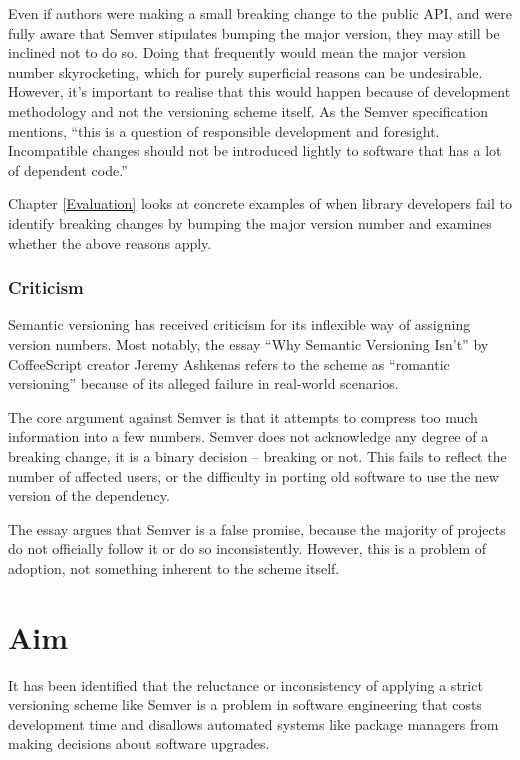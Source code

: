 \documentclass{l4proj}
\begin{document}
Even if authors were making a small breaking change to the public API,
and were fully aware that Semver stipulates bumping the major version,
they may still be inclined not to do so. Doing that frequently would
mean the major version number skyrocketing, which for purely
superficial reasons can be undesirable. However, it's important to
realise that this would happen because of development methodology and
not the versioning scheme itself. As the Semver specification
mentions, ``this is a question of responsible development and
foresight. Incompatible changes should not be introduced lightly to
software that has a lot of dependent code.''

Chapter \ref{Evaluation} looks at concrete examples of when
library developers fail to identify breaking changes by bumping the
major version number and examines whether the above reasons apply.

\subsubsection{Criticism}

Semantic versioning has received criticism for its inflexible way of
assigning version numbers. Most notably, the essay ``Why Semantic
Versioning Isn't'' \cite{WhySemanticVersioningIsnt} by CoffeeScript
creator Jeremy Ashkenas refers to the scheme as ``romantic
versioning'' because of its alleged failure in real-world scenarios.

The core argument against Semver is that it attempts to compress too
much information into a few numbers. Semver does not acknowledge any
degree of a breaking change, it is a binary decision -- breaking or not.
This fails to reflect the number of affected users, or the difficulty
in porting old software to use the new version of the dependency.

The essay argues that Semver is a false promise, because the majority
of projects do not officially follow it or do so inconsistently.
However, this is a problem of adoption, not something inherent to the
scheme itself.

\clearpage
\section{Aim}

It has been identified that the reluctance or inconsistency of
applying a strict versioning scheme like Semver is a problem in
software engineering that costs development time and disallows
automated systems like package managers from making decisions about
software upgrades.
\end{document}
